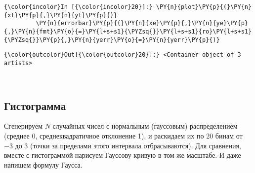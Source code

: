     \begin{Verbatim}[commandchars=\\\{\}]
{\color{incolor}In [{\color{incolor}20}]:} \PY{n}{plot}\PY{p}{(}\PY{n}{xt}\PY{p}{,}\PY{n}{yt}\PY{p}{)}
         \PY{n}{errorbar}\PY{p}{(}\PY{n}{xe}\PY{p}{,}\PY{n}{ye}\PY{p}{,}\PY{n}{fmt}\PY{o}{=}\PY{l+s+s1}{\PYZsq{}}\PY{l+s+s1}{ro}\PY{l+s+s1}{\PYZsq{}}\PY{p}{,}\PY{n}{yerr}\PY{o}{=}\PY{n}{yerr}\PY{p}{)}
\end{Verbatim}

            \begin{Verbatim}[commandchars=\\\{\}]
{\color{outcolor}Out[{\color{outcolor}20}]:} <Container object of 3 artists>
\end{Verbatim}
        
    \begin{center}
    \end{center}
    { \hspace*{\fill} \\}
    
\subsection{Гистограмма}
\label{matplotlib5}

Сгенерируем \(N\) случайных чисел с нормальным (гауссовым)
распределением (среднее 0, среднеквадратичное отклонение 1), и раскидаем
их по 20 бинам от \(-3\) до \(3\) (точки за пределами этого интервала
отбрасываются). Для сравнения, вместе с гистограммой нарисуем Гауссову
кривую в том же масштабе. И даже напишем формулу Гаусса.

